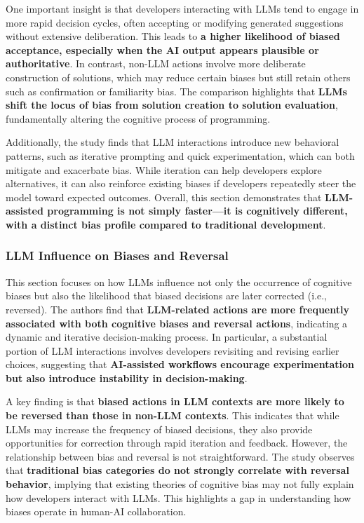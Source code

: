 One important insight is that developers interacting with LLMs tend to engage in more rapid decision cycles, often accepting or modifying generated suggestions without extensive deliberation. This leads to \textbf{a higher likelihood of biased acceptance, especially when the AI output appears plausible or authoritative}. In contrast, non-LLM actions involve more deliberate construction of solutions, which may reduce certain biases but still retain others such as confirmation or familiarity bias. The comparison highlights that \textbf{LLMs shift the locus of bias from solution creation to solution evaluation}, fundamentally altering the cognitive process of programming.

Additionally, the study finds that LLM interactions introduce new behavioral patterns, such as iterative prompting and quick experimentation, which can both mitigate and exacerbate bias. While iteration can help developers explore alternatives, it can also reinforce existing biases if developers repeatedly steer the model toward expected outcomes. Overall, this section demonstrates that \textbf{LLM-assisted programming is not simply faster—it is cognitively different, with a distinct bias profile compared to traditional development}.

\subsubsection{LLM Influence on Biases and Reversal}
This section focuses on how LLMs influence not only the occurrence of cognitive biases but also the likelihood that biased decisions are later corrected (i.e., reversed). The authors find that \textbf{LLM-related actions are more frequently associated with both cognitive biases and reversal actions}, indicating a dynamic and iterative decision-making process. In particular, a substantial portion of LLM interactions involves developers revisiting and revising earlier choices, suggesting that \textbf{AI-assisted workflows encourage experimentation but also introduce instability in decision-making}.

A key finding is that \textbf{biased actions in LLM contexts are more likely to be reversed than those in non-LLM contexts}. This indicates that while LLMs may increase the frequency of biased decisions, they also provide opportunities for correction through rapid iteration and feedback. However, the relationship between bias and reversal is not straightforward. The study observes that \textbf{traditional bias categories do not strongly correlate with reversal behavior}, implying that existing theories of cognitive bias may not fully explain how developers interact with LLMs. This highlights a gap in understanding how biases operate in human-AI collaboration.

